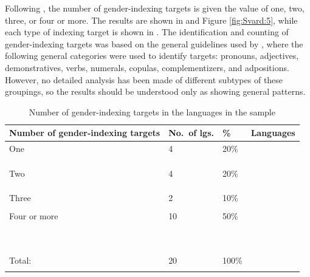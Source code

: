 \documentclass[output=collectionpaper]{langsci/langscibook}
\begin{document}
Following \citet[66]{DiGarbo2014}, the number of gender-indexing targets is given the value of one, two, three, or four or more. The results are shown in  and Figure \ref{fig:Svard:5}, while each type of indexing target is shown in . The identification and counting of gender-indexing targets was based on the general guidelines used by \citet[66]{DiGarbo2014}, where the following general categories were used to identify targets: pronouns, adjectives, demonstratives, verbs, numerals, copulas, complementizers, and adpositions. However, no detailed analysis has been made of different subtypes of these groupings, so the results should be understood only as showing general patterns.



\begin{table} 
\small
\begin{tabularx}{\textwidth}{lYYl}
\lsptoprule
Number of gender-indexing targets & No.\ of lgs. & \% & Languages \\
\midrule
One & 4& 20\% &  \\
&&&               \\
&&&               \\
&&&\\

Two & 4 & 20\% &    \\
&&&                   \\
&&&                      \\
&&& \\

Three & 2 & 10\% &         \\
&&&\\

Four or more & 10 & 50\% &     \\
&&&    \\
&&&       \\
&&&    \\
&&&    \\
&&&       \\
&&&     \\
&&&    \\
&&&     \\
&&&\\
\midrule
Total: & 20 & 100\% \\
\lspbottomrule
\end{tabularx}
\caption{Number of gender-indexing targets in the languages in the sample}
\label{tab:Svard:7}
\end{table}
\end{document}
